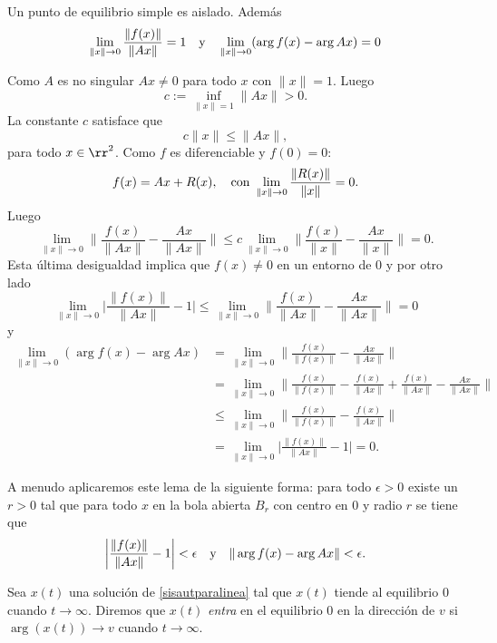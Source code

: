 \begin{lema}\label{simple=aislado} Un punto de equilibrio simple es aislado. Además
\[
    \lim\limits_{\|x\|\to
    0}\frac{\|f(x)\|}{\|Ax\|}=1\quad\hbox{y}\quad
    \lim\limits_{\|x\|\to 0}(\arg f(x)-\arg Ax)=0
\]
\end{lema}
\begin{demo} Como $A$ es no singular $Ax\neq 0$ para todo $x$ con
$\|x\|=1$. Luego
\[
    c:=\inf_{\|x\|=1}\|Ax\|>0.
\]
La constante $c$ satisface que
\begin{equation}\label{cinf}
    c\|x\|\leq \|Ax\|,
\end{equation}
para todo $x\in\rr^2$. Como $f$ es diferenciable y $f(0)=0$:
\begin{equation}\label{diferenciabilidad}
    f(x)=Ax+R(x),\quad\hbox{con } \lim\limits_{\|x\|\to
    0}\frac{\|R(x)\|}{\|x\|}=0.
\end{equation}
Luego
\[
    \lim\limits_{\|x\|\to
    0}\bigg\|\frac{f(x)}{\|Ax\|}-\frac{Ax}{\|Ax\|}\bigg\|
    \leq c\lim\limits_{\|x\|\to
    0}\bigg\|\frac{f(x)}{\|x\|}-\frac{Ax}{\|x\|}\bigg\|=0.
\]
Esta última desigualdad implica que $f(x)\neq 0$ en un entorno de
$0$ y por otro lado
\[
    \lim\limits_{\|x\|\to 0}\bigg|\frac{\|f(x)\|}{\|Ax\|}-1\bigg|
    \leq\lim\limits_{\|x\|\to 0} \bigg\|\frac{f(x)}{\|Ax\|}-\frac{Ax}{\|Ax\|}\bigg\|=0
\]
y
\[
\begin{split}
    \lim\limits_{\|x\|\to 0}(\arg f(x)-\arg Ax)&=
    \lim\limits_{\|x\|\to 0}
    \bigg\|\frac{f(x)}{\|f(x)\|}-\frac{Ax}{\|Ax\|}\bigg\|\\
    &=\lim\limits_{\|x\|\to 0} \bigg\|\frac{f(x)}{\|f(x)\|}-
    \frac{f(x)}{\|Ax\|}+
    \frac{f(x)}{\|Ax\|}-\frac{Ax}{\|Ax\|}\bigg\|\\
    &\leq \lim\limits_{\|x\|\to 0} \bigg\|\frac{f(x)}{\|f(x)\|}-
    \frac{f(x)}{\|Ax\|}\bigg\|\\
    &=\lim\limits_{\|x\|\to
    0}\bigg|\frac{\|f(x)\|}{\|Ax\|}-1\bigg|=0.
\end{split}
\]\end{demo}

A menudo aplicaremos este lema de la siguiente forma: para todo
$\epsilon>0$ existe un $r>0$ tal que para todo $x$ en la bola
abierta $B_r$ con centro en $0$ y radio $r$ se tiene que
\begin{equation}\label{contiargnorm}
 \bigg|\frac{\|f(x)\|}{\|Ax\|}-1\bigg|<\epsilon\quad\hbox{y}\quad \|\arg f(x)-\arg
 Ax\|<\epsilon.
\end{equation}

\begin{definicion} Sea $x(t)$ una solución de
\eqref{sisautparalinea} tal que $x(t)$ tiende al equilibrio $0$
cuando $t\to\infty$. Diremos que $x(t)$ \emph{entra} en el
equilibrio $0$ en la dirección de $v$ si $\arg(x(t))\to v$ cuando
$t\to\infty$.
\end{definicion}


